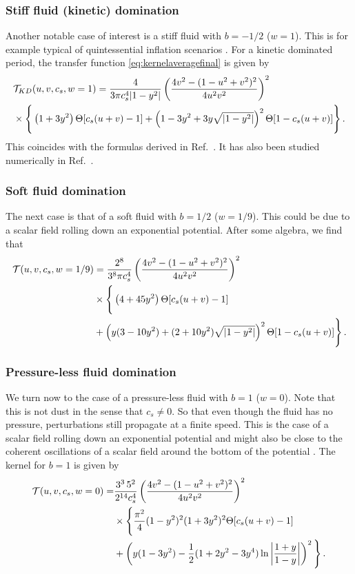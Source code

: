 \documentclass[a4paper,11pt]{article}
\numberwithin{equation}{section}
\begin{document}
\subsubsection{Stiff fluid (kinetic) domination}

Another notable case of interest is a stiff fluid with $b=-1/2$ ($w=1$). This is for example typical of quintessential inflation scenarios \cite{Spokoiny:1993kt,Peebles:1998qn,Brax:2005uf,Hossain:2014xha}. For a kinetic dominated period, the transfer function \eqref{eq:kernelaveragefinal} is given by
\begin{align}\label{eq:w1}
&{\cal T}_{KD}(u,v,c_s,w=1)=\frac{4}{3\pi c_s^4 |1-y^2|}\left(\frac{4v^2-(1-u^2+v^2)^2}{4u^2v^2}\right)^2\nonumber\\&\times
\Bigg\{\left(1+3y^2\right)\Theta[c_s(u+v)-1]
+\left(1-3y^2+3y\sqrt{|1-y^2|}\right)^2\Theta[1-c_s(u+v)]\Bigg\}\,.
\end{align}
This coincides with the formulas derived in Ref.~\cite{Domenech:2019quo,Domenech:2020kqm}. It has also been studied numerically in Ref.~\cite{Dalianis:2020cla}.

\subsubsection{Soft fluid domination}

The next case is that of a soft fluid with $b=1/2$ ($w=1/9$). This could be due to a scalar field rolling down an exponential potential. After some algebra, we find that  
\begin{align}\label{eq:w12}
{\cal T}(u,v,c_s,w=1/9)&=\frac{2^8}{3^8\pi c_s^4  }\left(\frac{4v^2-(1-u^2+v^2)^2}{4u^2v^2}\right)^2\nonumber\\&\times
\Bigg\{\left(4+45y^2\right)\Theta[c_s(u+v)-1]\nonumber\\&
+\left(y(3-10y^2)+(2+10y^2)\sqrt{|1-y^2|}\right)^2\Theta[1-c_s(u+v)]\Bigg\}\,.
\end{align}

\subsubsection{Pressure-less fluid domination}
We turn now to the case of a pressure-less fluid with $b=1$ ($w=0$). Note that this is not dust in the sense that $c_s\neq0$. So that even though the fluid has no pressure, perturbations still propagate at a finite speed. This is the case of a scalar field rolling down an exponential potential and might also be close to the coherent oscillations of a scalar field around the bottom of the potential \cite{Martin:2020fgl}. The kernel for $b=1$ is given by
\begin{align}\label{eq:w0}
{\cal T}(u,v,c_s,w=0)=&\frac{3^3 \,5^2}{2^{14} c_s^4}\left(\frac{4v^2-(1-u^2+v^2)^2}{4u^2v^2}\right)^2\nonumber\\&\times
\Bigg\{\frac{\pi^2}{4}(1-y^2)^2(1+3y^2)^2\Theta[c_s(u+v)-1]
\nonumber\\&+\left(y(1-3y^2)-\frac{1}{2}(1+2y^2-3y^4) \ln\left|\frac{1+y}{1-y}\right|\right)^2\Bigg\}\,.
\end{align}
\end{document}
